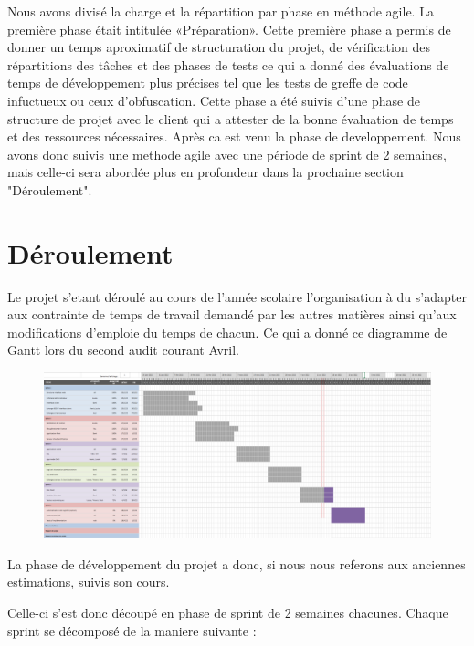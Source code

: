 Nous avons divisé la charge et la répartition par phase en méthode agile. La première phase était intitulée
«Préparation». Cette première phase a permis de donner un temps aproximatif de structuration du
projet, de vérification des répartitions des tâches et des phases de tests ce qui a donné des
évaluations de temps de développement plus précises tel que les tests de greffe de code infuctueux ou ceux
d'obfuscation. Cette phase a été suivis d'une phase de structure de projet avec le client qui a attester de la bonne évaluation de temps
et des ressources nécessaires. Après ca est venu la phase de developpement. Nous avons donc suivis une methode agile avec une période de sprint de 2 semaines, mais
celle-ci sera abordée plus en profondeur dans la prochaine section "Déroulement".\newline

\newpage

\section{Déroulement}

Le projet s'etant déroulé au cours de l'année scolaire l'organisation à du s'adapter aux
contrainte de temps de travail demandé par les autres matières ainsi qu'aux modifications d'emploie
du temps de chacun. Ce qui a donné ce diagramme de Gantt lors du second audit courant Avril.

\begin{figure}[!h]
	\centering
	\includegraphics[width=15cm]{Gantt.png}
\end{figure}

La phase de développement du projet a donc, si nous nous referons aux anciennes estimations, suivis son cours.\newline

Celle-ci s'est donc découpé en phase de sprint de 2 semaines chacunes. Chaque sprint se décomposé de la maniere suivante :  

